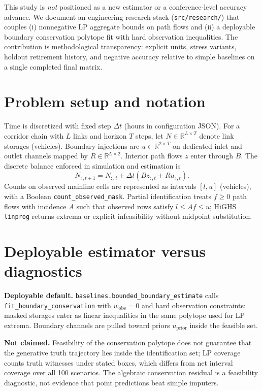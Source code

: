 \documentclass{article}
\begin{document}
This study is \emph{not} positioned as a new estimator or a conference-level accuracy advance.
We document an engineering research stack (\texttt{src/research/}) that couples (i) nonnegative LP
aggregate bounds on path flows and (ii) a deployable boundary conservation polytope fit with hard
observation inequalities.
The contribution is methodological transparency: explicit units, stress variants, holdout retirement
history, and negative accuracy relative to simple baselines on a single completed final matrix.

\section{Problem setup and notation}
Time is discretized with fixed step $\Delta t$ (hours in configuration JSON).
For a corridor chain with $L$ links and horizon $T$ steps, let $N \in \mathbb{R}^{L\times T}$ denote
link storages (vehicles).
Boundary injections are $u \in \mathbb{R}^{2\times T}$ on dedicated inlet and outlet channels mapped by
$R \in \mathbb{R}^{L\times 2}$.
Interior path flows $z$ enter through $B$.
The discrete balance enforced in simulation and estimation is
\begin{equation}
  N_{:,t+1} = N_{:,t} + \Delta t \left(B z_{:,t} + R u_{:,t}\right).
\end{equation}
Counts on observed mainline cells are represented as intervals $[l,u]$ (vehicles), with a Boolean
\texttt{count\_observed\_mask}.
Partial identification treats $f \ge 0$ path flows with incidence $A$ such that observed rows satisfy
$l \le A f \le u$; HiGHS \texttt{linprog} returns extrema or explicit infeasibility without midpoint substitution.

\section{Deployable estimator versus diagnostics}
\textbf{Deployable default.} \texttt{baselines.bounded\_boundary\_estimate} calls
\texttt{fit\_boundary\_conservation} with $w_{\mathrm{obs}}=0$ and hard observation constraints: masked
storages enter as linear inequalities in the same polytope used for LP extrema.
Boundary channels are pulled toward priors $u_{\mathrm{prior}}$ inside the feasible set.

\textbf{Not claimed.} Feasibility of the conservation polytope does not guarantee that the generative truth
trajectory lies inside the identification set; LP coverage counts truth witnesses under stated boxes, which
differs from net interval coverage over all 100 scenarios.
The algebraic conservation residual is a feasibility diagnostic, not evidence that point predictions beat
simple imputers.
\end{document}

